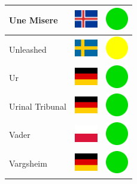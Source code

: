 \documentclass[12pt, a4paper, twoside]{report}
\begin{document}
\begin{center}
\begin{longtable}{|p{5cm}|p{2cm}|p{2cm}|}
Une Misere & \includegraphics[width=1cm]{4x3/is} & \includegraphics[width=1cm]{likes/y} \\ \hline
Unleashed & \includegraphics[width=1cm]{4x3/se} & \includegraphics[width=1cm]{likes/m} \\ \hline
Ur & \includegraphics[width=1cm]{4x3/de} & \includegraphics[width=1cm]{likes/y} \\ \hline
Urinal Tribunal & \includegraphics[width=1cm]{4x3/de} & \includegraphics[width=1cm]{likes/y} \\ \hline
Vader & \includegraphics[width=1cm]{4x3/pl} & \includegraphics[width=1cm]{likes/y} \\ \hline
Vargsheim & \includegraphics[width=1cm]{4x3/de} & \includegraphics[width=1cm]{likes/y} \\ \hline

\end{longtable}
\end{center}
\end{document}
